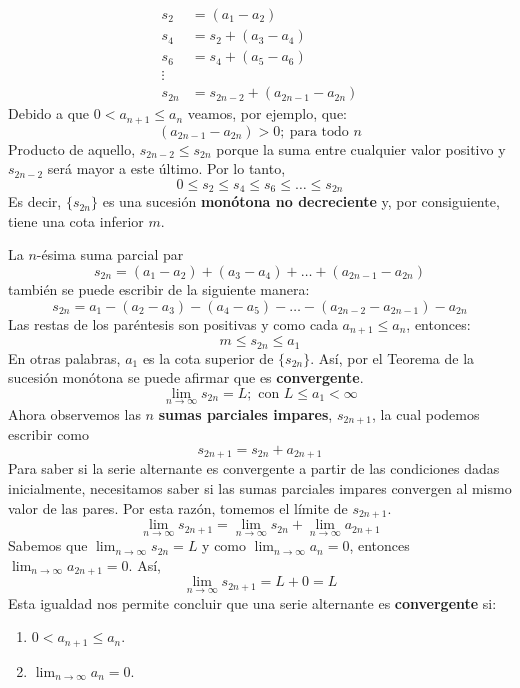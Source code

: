 \documentclass[12pt]{article}
\begin{document}
\begin{align*}
  s_{2} &= (a_{1} - a_{2}) \\
  s_{4} &= s_{2} + (a_{3} - a_{4}) \\
  s_{6} &= s_{4} + (a_{5} - a_{6}) \\
  \vdots \\
  s_{2n} &= s_{2n - 2} + (a_{2n - 1} - a_{2n})
\end{align*}
Debido a que $0 < a_{n + 1} \leq a_{n}$ veamos, por ejemplo, que:
\[
  (a_{2n - 1} - a_{2n}) > 0; \ \text{para todo } n
\]
Producto de aquello, $s_{2n - 2} \leq s_{2n}$ porque la suma entre cualquier valor positivo y $s_{2n - 2}$ será mayor a este último. Por lo tanto,
\[
  0 \leq s_{2} \leq s_{4} \leq s_{6} \leq \ldots \leq s_{2n}
\]
Es decir, $\{s_{2n}\}$ es una sucesión \textbf{monótona no decreciente} y, por consiguiente, tiene una cota inferior $m$.

La $n$-ésima suma parcial par
\[
  s_{2n} = (a_{1} - a_{2}) + (a_{3} - a_{4}) + \ldots + (a_{2n - 1} - a_{2n})
\]
también se puede escribir de la siguiente manera:
\[
  s_{2n} = a_{1} - (a_{2} - a_{3}) - (a_{4} - a_{5}) - \ldots - (a_{2n - 2} - a_{2n - 1}) - a_{2n}
\]
Las restas de los paréntesis son positivas y como cada $a_{n + 1} \leq a_{n}$, entonces:
\[
  m \leq s_{2n} \leq a_{1}
\]
En otras palabras, $a_{1}$ es la cota superior de $\{s_{2n}\}$. Así, por el Teorema de la sucesión monótona se puede afirmar que es \textbf{convergente}.
\[
  \lim_{n \to \infty} s_{2n} = L; \text{ con } L \leq a_{1} < \infty
\]
Ahora observemos las $n$ \textbf{sumas parciales impares}, $s_{2n + 1}$, la cual podemos escribir como
\[
  s_{2n + 1} = s_{2n} + a_{2n + 1}
\]
Para saber si la serie alternante es convergente a partir de las condiciones dadas inicialmente, necesitamos saber si las sumas parciales impares convergen al mismo valor de las pares. Por esta razón, tomemos el límite de $s_{2n + 1}$.
\[
  \lim_{n \to \infty} s_{2n + 1} = \lim_{n \to \infty} s_{2n} + \lim_{n \to \infty} a_{2n + 1}
\]
Sabemos que $\lim_{n \to \infty} s_{2n} = L$ y como $\lim_{n \to \infty} a_{n} = 0$, entonces $\lim_{n \to \infty} a_{2n + 1} = 0$. Así,
\[
  \lim_{n \to \infty} s_{2n + 1} = L + 0 = L
\]
Esta igualdad nos permite concluir que una serie alternante es \textbf{convergente} si:

\begin{enumerate}
\item $0 < a_{n + 1} \leq a_{n}$.
\item $\displaystyle \lim_{n \to \infty} a_{n} = 0$.
\end{enumerate}
\end{document}
